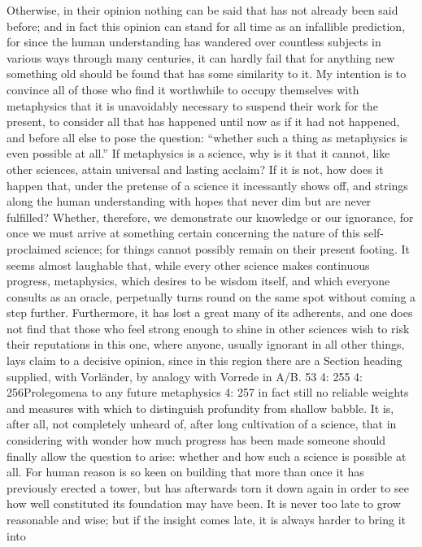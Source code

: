 Otherwise, in their opinion nothing can be said that has not already
been said before; and in fact this opinion can stand for all time as an
infallible prediction, for since the human understanding has wandered
over countless subjects in various ways through many centuries, it can
hardly fail that for anything new something old should be found that has
some similarity to it.
My intention is to convince all of those who ﬁnd it worthwhile to
occupy themselves with metaphysics that it is unavoidably necessary to
suspend their work for the present, to consider all that has happened until
now as if it had not happened, and before all else to pose the question:
“whether such a thing as metaphysics is even possible at all.”
If metaphysics is a science, why is it that it cannot, like other sciences,
attain universal and lasting acclaim? If it is not, how does it happen
that, under the pretense of a science it incessantly shows off, and strings
along the human understanding with hopes that never dim but are never
fulﬁlled? Whether, therefore, we demonstrate our knowledge or our
ignorance, for once we must arrive at something certain concerning the
nature of this self-proclaimed science; for things cannot possibly remain
on their present footing. It seems almost laughable that, while every other
science makes continuous progress, metaphysics, which desires to be
wisdom itself, and which everyone consults as an oracle, perpetually turns
round on the same spot without coming a step further. Furthermore,
it has lost a great many of its adherents, and one does not ﬁnd that
those who feel strong enough to shine in other sciences wish to risk
their reputations in this one, where anyone, usually ignorant in all other
things, lays claim to a decisive opinion, since in this region there are
a
Section heading supplied, with Vorländer, by analogy with Vorrede in A/B.
53
4: 255
4: 256Prolegomena to any future metaphysics
4: 257
in fact still no reliable weights and measures with which to distinguish
profundity from shallow babble.
It is, after all, not completely unheard of, after long cultivation of a
science, that in considering with wonder how much progress has been
made someone should ﬁnally allow the question to arise: whether and
how such a science is possible at all. For human reason is so keen on
building that more than once it has previously erected a tower, but has
afterwards torn it down again in order to see how well constituted its
foundation may have been. It is never too late to grow reasonable and
wise; but if the insight comes late, it is always harder to bring it into
